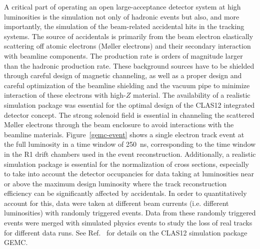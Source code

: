\documentclass[final,3p,twocolumn]{elsarticle}
\begin{document}
A critical part of operating an open large-acceptance detector system at high luminosities is the simulation not
only of hadronic events but also, and more importantly, the simulation of the beam-related accidental hits in the
tracking systems. The source of accidentals is primarily from the beam electron elastically scattering off atomic
electrons (M{\o}ller electrons) and their secondary interaction with beamline components. The production rate
is orders of magnitude larger than the hadronic production rate. These background sources have to be shielded
through careful design of magnetic channeling, as well as a proper design and careful optimization  of the beamline 
shielding and the vacuum
pipe to minimize interaction of these electrons with high-$Z$ material. The availability of a realistic simulation
package was essential for the optimal design of the CLAS12 integrated detector concept. The strong solenoid
field is essential in channeling the scattered M{\o}ller electrons through the beam enclosure to avoid interactions
with the beamline materials. Figure~\ref{gemc-event} shows a single electron track event at the full
luminosity in a time window of 250~ns, corresponding to the time window in the R1 drift chambers used in the event 
reconstruction. 
Additionally, a realistic simulation package is essential for the normalization of cross sections, especially to take
into account the detector occupancies for data taking at luminosities near or above the maximum design luminosity
where the track reconstruction efficiency can be significantly affected by accidentals. In order to quantitatively
account for this, data were taken at different beam currents (i.e. different luminosities) with randomly triggered
events. Data from these randomly triggered events were merged with simulated physics events to study the loss
of real tracks for different data runs. See Ref.~\cite{GEMC} for details on the CLAS12 simulation package GEMC.
\end{document}
